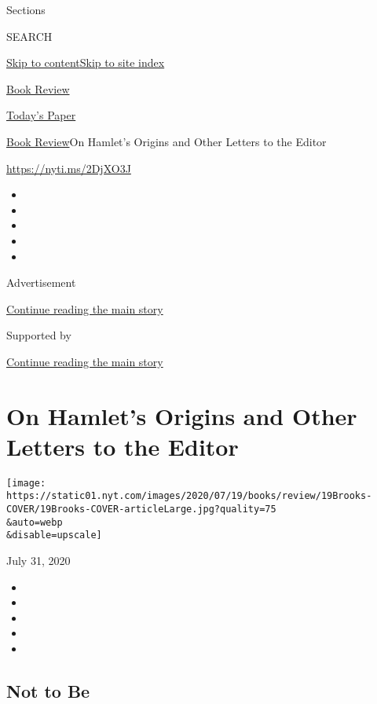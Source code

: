 Sections

SEARCH

\protect\hyperlink{site-content}{Skip to
content}\protect\hyperlink{site-index}{Skip to site index}

\href{https://www.nytimes.com/section/books/review}{Book Review}

\href{https://myaccount.nytimes.com/auth/login?response_type=cookie\&client_id=vi}{}

\href{https://www.nytimes.com/section/todayspaper}{Today's Paper}

\href{/section/books/review}{Book Review}\textbar{}On Hamlet's Origins
and Other Letters to the Editor

\url{https://nyti.ms/2DjXO3J}

\begin{itemize}
\item
\item
\item
\item
\item
\end{itemize}

Advertisement

\protect\hyperlink{after-top}{Continue reading the main story}

Supported by

\protect\hyperlink{after-sponsor}{Continue reading the main story}

\hypertarget{on-hamlets-origins-and-other-letters-to-the-editor}{%
\section{On Hamlet's Origins and Other Letters to the
Editor}\label{on-hamlets-origins-and-other-letters-to-the-editor}}

\texttt{[image: https://static01.nyt.com/images/2020/07/19/books/review/19Brooks-COVER/19Brooks-COVER-articleLarge.jpg?quality=75\\\&auto=webp\\\&disable=upscale]}

July 31, 2020

\begin{itemize}
\item
\item
\item
\item
\item
\end{itemize}

\hypertarget{not-to-be}{%
\subsection{Not to Be}\label{not-to-be}}

